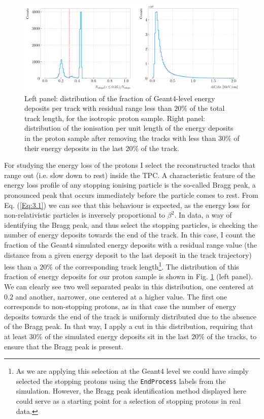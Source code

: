\begin{figure}[t]
	\centering
	\includegraphics[width=.99\linewidth]{Images/GArSoft_PID/dEdx/geant_selection_dEdx.pdf}
	\caption{Left panel: distribution of the fraction of Geant4-level energy deposits per track with residual range less than $20\%$ of the total track length, for the isotropic proton sample. Right panel: distribution of the ionisation per unit length of the energy deposits in the proton sample after removing the tracks with less than $30\%$ of their energy deposits in the last $20\%$ of the track.}
	\label{fig:geant_edeps}
\end{figure}

For studying the energy loss of the protons I select the reconstructed tracks that range out (i.e. slow down to rest) inside the TPC. A characteristic feature of the energy loss profile of any stopping ionising particle is the so-called Bragg peak, a pronounced peak that occurs immediately before the particle comes to rest. From Eq. (\ref{Eq:3.1}) we can see that this behaviour is expected, as the energy loss for non-relativistic particles is inversely proportional to $\beta^{2}$. In data, a way of identifying the Bragg peak, and thus select the stopping particles, is checking the number of energy deposits towards the end of the track. In this case, I count the fraction of the Geant4 simulated energy deposits with a residual range value (the distance from a given energy deposit to the last deposit in the track trajectory) less than a $20\%$ of the corresponding track length\footnote{As we are applying this selection at the Geant4 level we could have simply selected the stopping protons using the \texttt{EndProcess} labels from the simulation. However, the Bragg peak identification method displayed here could serve as a starting point for a selection of stopping protons in real data.}. The distribution of this fraction of energy deposits for our proton sample is shown in Fig. \ref{fig:geant_edeps} (left panel). We can clearly see two well separated peaks in this distribution, one centered at $0.2$ and another, narrower, one centered at a higher value. The first one corresponds to non-stopping protons, as in that case the number of energy deposits towards the end of the track is uniformly distributed due to the absence of the Bragg peak. In that way, I apply a cut in this distribution, requiring that at least $30\%$ of the simulated energy deposits sit in the last $20\%$ of the tracks, to ensure that the Bragg peak is present.

